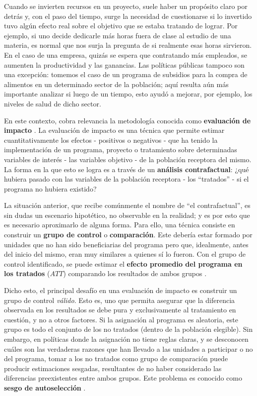 \documentclass[../main.tex]{subfiles}
\begin{document}
Cuando se invierten recursos en un proyecto, suele haber un propósito claro por detrás y,
con el paso del tiempo, surge la necesidad de cuestionarse si lo invertido tuvo algún
efecto real sobre el objetivo que se estaba tratando de lograr. Por ejemplo, si uno decide
dedicarle más horas fuera de clase al estudio de una materia, es normal que nos surja la
pregunta de si realmente esas horas sirvieron. En el caso de una empresa, quizás se espera
que contratando más empleados, se aumenten la productividad y las ganancias. Las políticas
públicas tampoco son una excepción: tomemos el caso de un programa de subsidios para la
compra de alimentos en un determinado sector de la población; aquí resulta aún más
importante analizar si luego de un tiempo, esto ayudó a mejorar, por ejemplo, los niveles
de salud de dicho sector.

En este contexto, cobra relevancia la metodología conocida como \textbf{evaluación de
impacto} \cite{bernal}\cite{gertler-2016}. La evaluación de impacto es una técnica que
permite estimar cuantitativamente los efectos - positivos o negativos - que ha tenido la
implementación de un programa, proyecto o tratamiento sobre determinadas variables de
interés - las variables objetivo - de la población receptora del mismo. La forma en la que
esto se logra es a través de un \textbf{análisis contrafactual}: ¿qué hubiera pasado con
las variables de la población receptora - los ``tratados'' - si el programa no hubiera
existido?

La situación anterior, que recibe comúnmente el nombre de ``el contrafactual'', es sin
dudas un escenario hipotético, no observable en la realidad; y es por esto que es
necesario aproximarlo de alguna forma. Para ello, una técnica consiste en construir un
\textbf{grupo de control} o \textbf{comparación}. Este debería estar formado por unidades
que no han sido beneficiarias del programa pero que, idealmente, antes del inicio del
mismo, eran muy similares a quienes sí lo fueron. Con el grupo de control identificado, se
puede estimar el \textbf{efecto promedio del programa en los tratados} (\(ATT\))
comparando los resultados de ambos grupos \cite{rubin1974}.

Dicho esto, el principal desafío en una evaluación de impacto es construir un grupo de
control \textit{válido}. Esto es, uno que permita asegurar que la diferencia observada en
los resultados se debe pura y exclusivamente al tratamiento en cuestión, y no a otros
factores. Si la asignación al programa es aleatoria, este grupo es todo el conjunto de los
no tratados (dentro de la población elegible). Sin embargo, en políticas donde la
asignación no tiene reglas claras, y se desconocen cuáles son las verdaderas razones que
han llevado a las unidades a participar o no del programa, tomar a los no tratados como
grupo de comparación puede producir estimaciones sesgadas, resultantes de no haber
considerado las diferencias preexistentes entre ambos grupos. Este problema es conocido
como \textbf{sesgo de autoselección} \cite{bernal}\cite{mostly-harmless-econometrics}.
\end{document}
